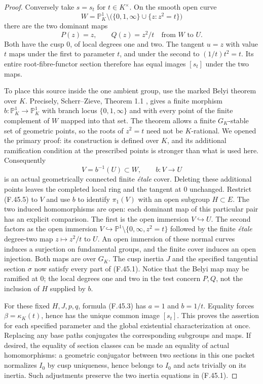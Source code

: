 \documentclass[11pt,oneside]{article}
\begin{document}
\begin{proof}
Conversely take $s=s_t$ for $t\in K^\times$. On the smooth open
curve
\[
 W=\mathbb P^1_K\setminus
       \bigl(\{0,1,\infty\}\cup\{z:z^2=t\}\bigr)
\]
there are the two dominant maps
\[
               P(z)=z,\qquad Q(z)=z^2/t
                       \quad\text{from }W\text{ to }U.
 \tag{F.45.5}
\]
Both have the cusp $0$, of local degrees one and two. The tangent
$u=z$ with value $t$ maps under the first to parameter $t$, and
under the second to $(1/t)t^2=t$. Its entire root-fibre-functor
section therefore has equal images $[s_t]$ under the two maps.

To place this source inside the one ambient group, use the marked
Belyi theorem over $K$. Precisely, Scherr--Zieve, Theorem 1.1
\cite{F-ScherrZieve}, gives a finite morphism
$b:\mathbb P^1_K\to\mathbb P^1_K$ with branch locus
$\{0,1,\infty\}$ and with every point of the finite complement
of $W$ mapped into that set. The theorem allows a finite
$G_K$-stable set of geometric points, so the roots of $z^2=t$
need not be $K$-rational. We opened the primary proof: its
construction is defined over $K$, and its additional ramification
condition at the prescribed points is stronger than what is
used here. Consequently
\[
 V=b^{-1}(U)\subset W,\qquad b:V\longrightarrow U
 \tag{F.45.6}
\]
is an actual geometrically connected finite \emph{\'etale} cover.
Deleting these additional points leaves the completed local ring
and the tangent at $0$ unchanged. Restrict (F.45.5) to $V$ and
use $b$ to identify $\pi_1(V)$ with an open subgroup $H\subset E$.
The two induced homomorphisms are open: each dominant map of
this particular pair has an explicit comparison. The first is
the open immersion $V\hookrightarrow U$. The second factors as
the open immersion
$V\hookrightarrow\mathbb P^1\setminus\{0,\infty,z^2=t\}$
followed by the finite \emph{\'etale} degree-two map $z\mapsto z^2/t$
to $U$. An open immersion of these normal curves induces a
surjection on fundamental groups, and the finite cover induces
an open injection. Both maps are over $G_K$. The cusp inertia $J$ and
the specified tangential section $\sigma$ now satisfy every part
of (F.45.1). Notice that the Belyi map may be ramified at $0$;
the local degrees one and two in the test concern $P,Q$, not
the inclusion of $H$ supplied by $b$.

For these fixed $H,J,p,q$, formula (F.45.3) has $a=1$ and
$b=1/t$. Equality forces $\beta=\kappa_K(t)$, hence has the
unique common image $[s_t]$. This proves the assertion for each
specified parameter and the global existential characterization
at once. Replacing any base paths conjugates the corresponding
subgroups and maps. If desired, the equality of section classes
can be made an equality of actual homomorphisms: a geometric
conjugator between two sections in this one packet normalizes
$I_0$ by cusp uniqueness, hence belongs to $I_0$ and acts
trivially on its inertia. Such adjustments preserve the two
inertia equations in (F.45.1).


\end{proof}
\end{document}
